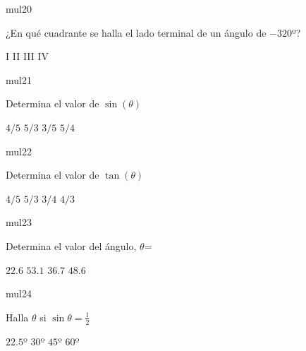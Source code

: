 \documentclass[a4paper]{article}
\begin{document}
\begin{question}{mul20}

¿En qué cuadrante se halla el lado terminal de un ángulo de $-320$º?

\begin{choices}
      \choice I
      \choice II
      \choice  III
      \choice IV
\end{choices}
\end{question}

\begin{question}{mul21}


Determina el valor de  \(\sin{(\theta)}\)

 \begin{choices}
            \choice $4/5$
            \choice $5/3$
            \choice $3/5$
            \choice $5/4$
 \end{choices}
\end{question}

\begin{question}{mul22} 
 
Determina el valor de  \(\tan{(\theta)}\)

 \begin{choices}
            \choice $4/5$
            \choice $5/3$
            \choice $3/4$
            \choice $4/3$
 \end{choices}
\end{question}

\begin{question}{mul23}
  
Determina el valor del ángulo, \(\theta\)=

 \begin{choices}
            \choice $22.6$
            \choice $53.1$
            \choice$36.7$
            \choice $48.6$
 \end{choices}
\end{question}

\begin{question}{mul24} 
 
 Halla  $\theta$ si \(\sin{\theta}=\frac{1}{2}\) 
 
 \begin{choices}
            \choice $22.5$º
            \choice $30 $º
            \choice $45$º
            \choice$60$º
 \end{choices}
\end{question}
\end{document}
